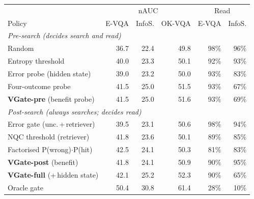 \begin{tabular}{@{}lrrrrr@{}}
\toprule
 & \multicolumn{3}{c}{nAUC} & \multicolumn{2}{c}{Read} \\
Policy & E-VQA & InfoS. & OK-VQA & E-VQA & InfoS. \\
\midrule
\multicolumn{6}{l}{\emph{Pre-search (decides search and read)}} \\
Random & 36.7 & 22.4 & 49.8 & 98\% & 96\% \\
Entropy threshold & 40.0 & 23.3 & 50.1 & 92\% & 93\% \\
Error probe (hidden state) & 39.0 & 23.2 & 50.0 & 93\% & 83\% \\
Four-outcome probe & 41.5 & 25.0 & 51.5 & 93\% & 67\% \\
\textbf{VGate-pre} (benefit probe) & 41.5 & 25.0 & 51.6 & 93\% & 69\% \\
\midrule
\multicolumn{6}{l}{\emph{Post-search (always searches; decides read)}} \\
Error gate (unc.\,+\,retriever) & 39.5 & 23.1 & 50.6 & 98\% & 94\% \\
NQC threshold (retriever) & 41.8 & 23.6 & 50.1 & 89\% & 85\% \\
Factorised P(wrong)$\cdot$P(hit) & 42.5 & 24.1 & 50.3 & 81\% & 83\% \\
\textbf{VGate-post} (benefit) & 41.8 & 24.1 & 50.9 & 90\% & 95\% \\
\textbf{VGate-full} (+\,hidden state) & 42.1 & 25.2 & 52.3 & 90\% & 65\% \\
\midrule
Oracle gate & 50.4 & 30.8 & 61.4 & 28\% & 10\% \\
\bottomrule
\end{tabular}
